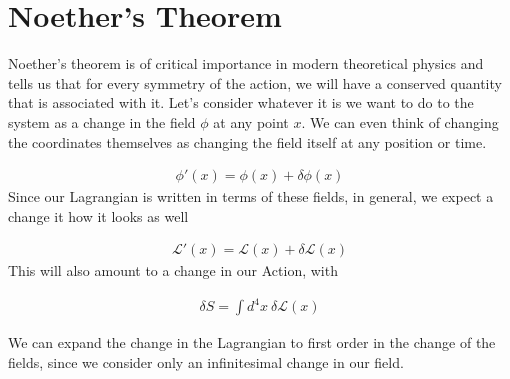 \section{Noether's Theorem}


Noether's theorem is of critical importance in modern theoretical physics and tells us that for every symmetry of the action, we will have a conserved quantity that is associated with it. Let's consider whatever it is we want to do to the system as a change in the field $\phi$ at any point $x$. We can even think of changing the coordinates themselves as changing the field itself at any position or time.

\begin{align}
    \phi'(x) = \phi(x) + \delta\phi(x)
\end{align}
Since our Lagrangian is written in terms of these fields, in general, we expect a change it how it looks as well

\begin{align}\label{lprime}
    \mathcal{L}'(x) = \mathcal{L}(x) +\delta\mathcal{L}(x)
\end{align}
This will also amount to a change in our Action, with

\begin{align}\label{daction}
    \delta S = \int d^4x~\delta\mathcal{L}(x) 
\end{align}

We can expand the change in the Lagrangian to first order in the change of the fields, since we consider only an infinitesimal change in our field.

